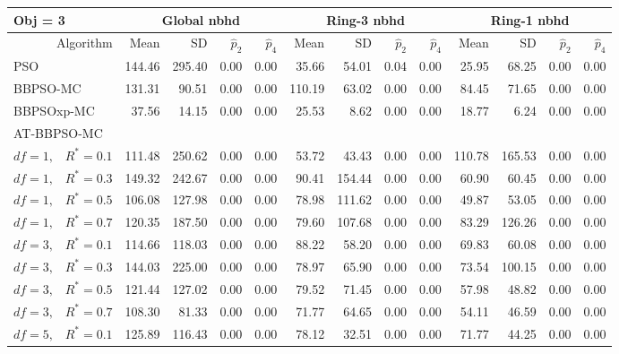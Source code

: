 \documentclass[12pt]{article}
\begin{document}
\begin{table}[ht]
\centering
\footnotesize{
\begin{tabular}{r|rrrr|rrrr|rrrr}
\multicolumn{1}{l}{Obj = 3} & \multicolumn{4}{c}{Global nbhd} & \multicolumn{4}{c}{Ring-3 nbhd} & \multicolumn{4}{c}{Ring-1 nbhd}\\
  \hline
Algorithm & Mean & SD & $\widehat{p}_2$ & $\widehat{p}_4$ & Mean & SD & $\widehat{p}_2$ & $\widehat{p}_4$ & Mean & SD & $\widehat{p}_2$ & $\widehat{p}_4$ \\ 
  \hline
\multicolumn{1}{l|}{PSO} & 144.46 & 295.40 & 0.00 & 0.00 & 35.66 & 54.01 & 0.04 & 0.00 & 25.95 & 68.25 & 0.00 & 0.00 \\ 
  \multicolumn{1}{l|}{BBPSO-MC} & 131.31 & 90.51 & 0.00 & 0.00 & 110.19 & 63.02 & 0.00 & 0.00 & 84.45 & 71.65 & 0.00 & 0.00 \\ 
  \multicolumn{1}{l|}{BBPSOxp-MC} & 37.56 & 14.15 & 0.00 & 0.00 & 25.53 & 8.62 & 0.00 & 0.00 & 18.77 & 6.24 & 0.00 & 0.00 \\ 
\hline
\multicolumn{1}{l|}{AT-BBPSO-MC} &&&&&&&&&&&&\\
  $df = 1,\enspace$ $R^* =0.1$ & 111.48 & 250.62 & 0.00 & 0.00 & 53.72 & 43.43 & 0.00 & 0.00 & 110.78 & 165.53 & 0.00 & 0.00 \\ 
  $df = 1,\enspace$ $R^* =0.3$ & 149.32 & 242.67 & 0.00 & 0.00 & 90.41 & 154.44 & 0.00 & 0.00 & 60.90 & 60.45 & 0.00 & 0.00 \\ 
  $df = 1,\enspace$ $R^* =0.5$ & 106.08 & 127.98 & 0.00 & 0.00 & 78.98 & 111.62 & 0.00 & 0.00 & 49.87 & 53.05 & 0.00 & 0.00 \\ 
  $df = 1,\enspace$ $R^* =0.7$ & 120.35 & 187.50 & 0.00 & 0.00 & 79.60 & 107.68 & 0.00 & 0.00 & 83.29 & 126.26 & 0.00 & 0.00 \\ 
  $df = 3,\enspace$ $R^* =0.1$ & 114.66 & 118.03 & 0.00 & 0.00 & 88.22 & 58.20 & 0.00 & 0.00 & 69.83 & 60.08 & 0.00 & 0.00 \\ 
  $df = 3,\enspace$ $R^* =0.3$ & 144.03 & 225.00 & 0.00 & 0.00 & 78.97 & 65.90 & 0.00 & 0.00 & 73.54 & 100.15 & 0.00 & 0.00 \\ 
  $df = 3,\enspace$ $R^* =0.5$ & 121.44 & 127.02 & 0.00 & 0.00 & 79.52 & 71.45 & 0.00 & 0.00 & 57.98 & 48.82 & 0.00 & 0.00 \\ 
  $df = 3,\enspace$ $R^* =0.7$ & 108.30 & 81.33 & 0.00 & 0.00 & 71.77 & 64.65 & 0.00 & 0.00 & 54.11 & 46.59 & 0.00 & 0.00 \\ 
  $df = 5,\enspace$ $R^* =0.1$ & 125.89 & 116.43 & 0.00 & 0.00 & 78.12 & 32.51 & 0.00 & 0.00 & 71.77 & 44.25 & 0.00 & 0.00 \\ 

\end{tabular}}
\end{table}
\end{document}
